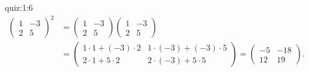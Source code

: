 \begin{answerof}{quiz:1:6}
  \begin{align*}
    \begin{pmatrix}
      1&-3\\2&5
    \end{pmatrix}^2
    &=
    \begin{pmatrix}
      1&-3\\2&5
    \end{pmatrix}
    \begin{pmatrix}
      1&-3\\2&5
    \end{pmatrix}\\
   & =
    \begin{pmatrix}
      1\cdot 1+(-3)\cdot 2&1\cdot(-3)+(-3)\cdot 5\\2\cdot1 +5\cdot2&2\cdot(-3) +5\cdot5
    \end{pmatrix}
    =
    \begin{pmatrix}
      -5&-18\\12&19
    \end{pmatrix}.
  \end{align*}

\end{answerof}

